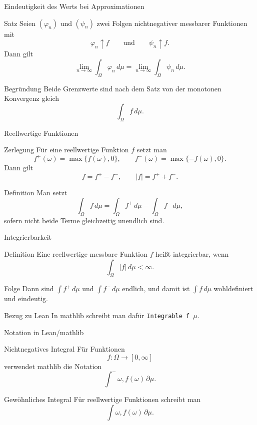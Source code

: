 \documentclass{beamer}
\begin{document}
\begin{frame}{Eindeutigkeit des Werts bei Approximationen}
\begin{block}{Satz}
Seien \((\varphi_n)\) und \((\psi_n)\) zwei Folgen nichtnegativer messbarer Funktionen mit
\[
\varphi_n\uparrow f
\qquad\text{und}\qquad
\psi_n\uparrow f.
\]
Dann gilt
\[
\lim_{n\to\infty}\int_\Omega \varphi_n\,d\mu
=
\lim_{n\to\infty}\int_\Omega \psi_n\,d\mu.
\]
\end{block}

\begin{block}{Begründung}
Beide Grenzwerte sind nach dem Satz von der monotonen Konvergenz gleich
\[
\int_\Omega f\,d\mu.
\]
\end{block}
\end{frame}

\begin{frame}{Reellwertige Funktionen}
\begin{block}{Zerlegung}
Für eine reellwertige Funktion \(f\) setzt man
\[
f^+(\omega)=\max\{f(\omega),0\},
\qquad
f^-(\omega)=\max\{-f(\omega),0\}.
\]
Dann gilt
\[
f=f^+-f^-,
\qquad
|f|=f^++f^-.
\]
\end{block}

\begin{block}{Definition}
Man setzt
\[
\int_\Omega f\,d\mu
=
\int_\Omega f^+\,d\mu-\int_\Omega f^-\,d\mu,
\]
sofern nicht beide Terme gleichzeitig unendlich sind.
\end{block}
\end{frame}

\begin{frame}{Integrierbarkeit}
\begin{block}{Definition}
Eine reellwertige messbare Funktion \(f\) hei\ss{}t integrierbar, wenn
\[
\int_\Omega |f|\,d\mu<\infty.
\]
\end{block}

\begin{block}{Folge}
Dann sind \(\int f^+\,d\mu\) und \(\int f^-\,d\mu\) endlich, und damit ist \(\int f\,d\mu\) wohldefiniert und eindeutig.
\end{block}

\begin{block}{Bezug zu Lean}
In mathlib schreibt man dafür \texttt{Integrable f $\mu$}.
\end{block}
\end{frame}


\begin{frame}{Notation in Lean/mathlib}
\begin{block}{Nichtnegatives Integral}
Für Funktionen
\[
f\colon \Omega\to[0,\infty]
\]
verwendet mathlib die Notation
\[
\int^- \omega, f(\omega)\,\partial\mu.
\]
\end{block}

\begin{block}{Gewöhnliches Integral}
Für reellwertige Funktionen schreibt man
\[
\int \omega, f(\omega)\,\partial\mu.
\]
\end{block}
\end{frame}
\end{document}
